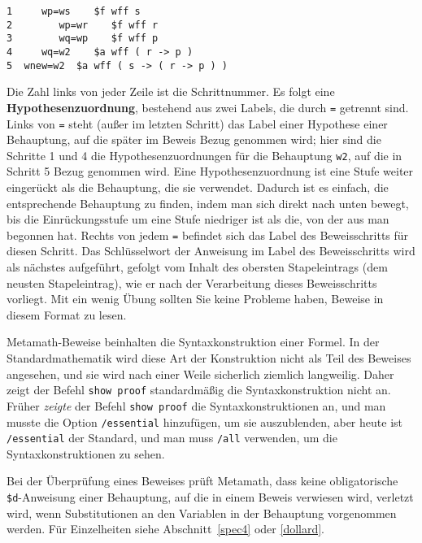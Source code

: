\begin{verbatim}
1     wp=ws    $f wff s
2        wp=wr    $f wff r
3        wq=wp    $f wff p
4     wq=w2    $a wff ( r -> p )
5  wnew=w2  $a wff ( s -> ( r -> p ) )
\end{verbatim}

Die Zahl links von jeder Zeile ist die Schrittnummer.  Es folgt eine {\bf Hypothesenzuordnung}, bestehend aus zwei Labels, die durch \texttt{=} getrennt sind.  Links von \texttt{=} steht (außer im letzten Schritt) das Label einer Hypothese einer Behauptung, auf die später im Beweis Bezug genommen wird; hier sind die Schritte 1 und 4 die Hypothesenzuordnungen für die Behauptung \texttt{w2}, auf die in Schritt 5 Bezug genommen wird.  Eine Hypothesenzuordnung ist eine Stufe weiter eingerückt als die Behauptung, die sie verwendet. Dadurch ist es einfach, die entsprechende Behauptung zu finden, indem man sich direkt nach unten bewegt, bis die Einrückungsstufe um eine Stufe niedriger ist als die, von der aus man begonnen hat.  Rechts von jedem \texttt{=} befindet sich das Label des Beweisschritts für diesen Schritt.  Das Schlüsselwort der Anweisung im Label des Beweisschritts wird als nächstes aufgeführt, gefolgt vom Inhalt des obersten Stapeleintrags (dem neusten Stapeleintrag), wie er nach der Verarbeitung dieses Beweisschritts vorliegt.  Mit ein wenig Übung sollten Sie keine Probleme haben, Beweise in diesem Format zu lesen.

Metamath-Beweise beinhalten die Syntaxkonstruktion einer Formel. In der Standardmathematik wird diese Art der Konstruktion nicht als Teil des Beweises angesehen, und sie wird nach einer Weile sicherlich ziemlich langweilig. Daher zeigt der Befehl \texttt{show proof} standardmäßig die Syntaxkonstruktion nicht an.
Früher \textit{zeigte} der Befehl \texttt{show proof} die Syntaxkonstruktionen an, und man musste die Option
\texttt{/essential} hinzufügen, um sie auszublenden, aber heute ist
\texttt{/essential} der Standard, und man muss
\texttt{/all} verwenden, um die Syntaxkonstruktionen zu sehen.

Bei der Überprüfung eines Beweises prüft Metamath, dass keine obligatorische \texttt{\$d}-Anweisung einer Behauptung, auf die in einem Beweis verwiesen wird, verletzt wird, wenn Substitutionen an den Variablen in der Behauptung vorgenommen werden.  Für Einzelheiten siehe Abschnitt~\ref{spec4} oder \ref{dollard}.

